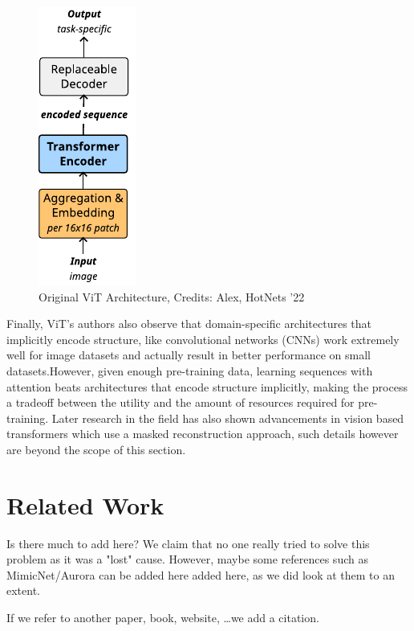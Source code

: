 \begin{figure}[!hbt]
  \begin{center}
    \includegraphics[scale=1.5]{figures/architecture_vit.pdf}
    \caption{Original ViT Architecture, Credits: Alex, HotNets '22}
    \label{fig:vit}
  \end{center}
\end{figure}


Finally, ViT's authors also observe that domain-specific architectures that implicitly encode structure, like convolutional networks (CNNs) work extremely well for image datasets and  actually result in better performance on small datasets.However, given enough pre-training data, learning sequences with attention beats architectures that encode structure implicitly, making the process a tradeoff between the utility and the amount of resources required for pre-training. Later research in the field has also shown advancements in vision based transformers which use a masked reconstruction approach\cite{heMaskedAutoencodersAre2021}, such details however are beyond the scope of this section. 


\section{Related Work}
\label{sec:related_worl}

Is there much to add here? We claim that no one really tried to solve this problem as it was a "lost" cause. However, maybe some references such as MimicNet/Aurora can be added here added here, as we did look at them to an extent.

If we refer to another paper, book, website, \dots we add a
citation.